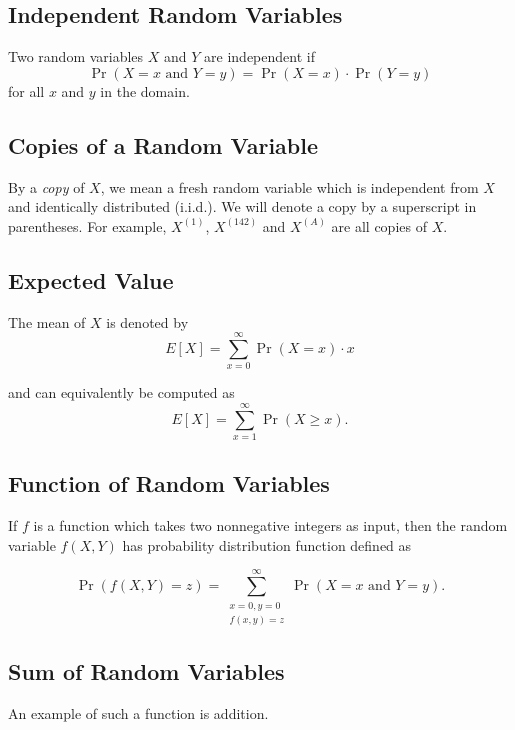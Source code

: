 \documentclass{masterthesis}
\begin{document}
\subsection*{Independent Random Variables}\label{paragraph:independent_random_variables}
Two random variables $X$ and $Y$ are independent if 
\begin{equation}
    \Pr(X = x \text{ and } Y = y) = \Pr(X = x) \cdot \Pr(Y = y)
\end{equation}
for all $x$ and $y$ in the domain.

\subsection*{Copies of a Random Variable}\label{paragraph:copies_of_a_random_variable} By a \textit{copy} of $X$, we mean a fresh random variable which is independent from $X$ and identically distributed (i.i.d.).
We will denote a copy by a superscript in parentheses. For example, $X^{(1)}$, $X^{(142)}$ and $X^{(A)}$ are all copies of $X$.

\subsection*{Expected Value}
The mean of $X$ is denoted by 
\begin{equation}\label{eq:expectation}
    E[X] = \sum_{x=0}^{\infty} \Pr(X = x) \cdot x
\end{equation}

and can equivalently be computed as 
\begin{equation}
    E[X] = \sum_{x=1}^{\infty} \Pr(X \geq x).
\end{equation}

\subsection*{Function of Random Variables}\label{paragraph:function_of_random_variables}
If $f$ is a function which takes two nonnegative integers as input, then the random variable $f(X, Y)$ has probability distribution function defined as

\begin{equation}
    \Pr(f(X, Y) = z) = \sum_{\substack{x=0, y=0 \\ f(x,y)=z}}^{\infty} \Pr(X = x \text{ and } Y = y).
\end{equation}

\subsection*{Sum of Random Variables}\label{paragraph:sum_of_random_variables}
An example of such a function is addition. 
\end{document}

